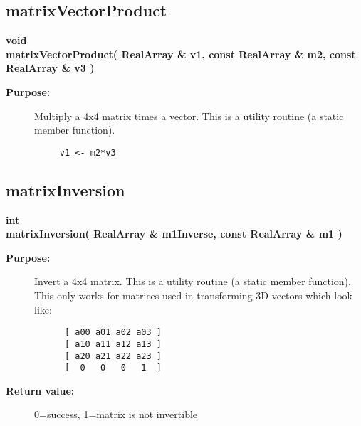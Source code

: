 \subsection{matrixVectorProduct}
 
\begin{flushleft} \textbf{%
void   \\ 
\settowidth{\MatrixMappingIncludeArgIndent}{matrixVectorProduct(}%
matrixVectorProduct( RealArray \& v1, const RealArray \& m2, const RealArray \& v3 )
}\end{flushleft}
\begin{description}
\item[{\bf Purpose:}]  
   Multiply a 4x4 matrix times a vector. This is a utility routine (a static member function).
 \begin{verbatim}
     v1 <- m2*v3
 \end{verbatim}
\end{description}
\subsection{matrixInversion}
 
\begin{flushleft} \textbf{%
int   \\ 
\settowidth{\MatrixMappingIncludeArgIndent}{matrixInversion(}%
matrixInversion( RealArray \& m1Inverse, const RealArray \& m1 )
}\end{flushleft}
\begin{description}
\item[{\bf Purpose:}]  
   Invert a 4x4 matrix. This is a utility routine (a static member function).
   This only works for matrices used in transforming
 3D vectors which look like:
 \begin{verbatim}
      [ a00 a01 a02 a03 ]
      [ a10 a11 a12 a13 ]
      [ a20 a21 a22 a23 ]
      [  0   0   0   1  ]
 \end{verbatim}
\item[{\bf Return value:}]  0=success, 1=matrix is not invertible
\end{description}
